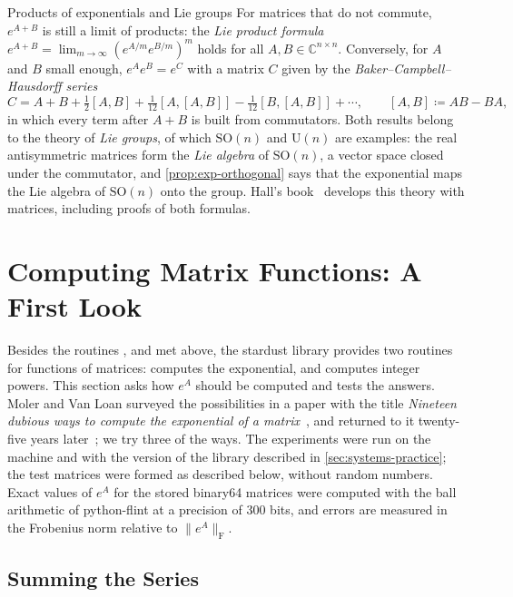\begin{note}{Products of exponentials and Lie groups}
For matrices that do not commute, $e^{A+B}$ is still a limit of products: the \emph{Lie product formula} $e^{A+B}=\lim_{m\to\infty}(e^{A/m}e^{B/m})^m$ holds for all $A,B\in\mathbb C^{n\times n}$. Conversely, for $A$ and $B$ small enough, $e^Ae^B=e^C$ with a matrix $C$ given by the \emph{Baker--Campbell--Hausdorff series}
\[
C=A+B+\tfrac12[A,B]+\tfrac1{12}[A,[A,B]]-\tfrac1{12}[B,[A,B]]+\cdots,\qquad[A,B]\coloneqq AB-BA ,
\]
in which every term after $A+B$ is built from commutators. Both results belong to the theory of \emph{Lie groups}, of which $\mathrm{SO}(n)$ and $\mathrm U(n)$ are examples: the real antisymmetric matrices form the \emph{Lie algebra} of $\mathrm{SO}(n)$, a vector space closed under the commutator, and \cref{prop:exp-orthogonal} says that the exponential maps the Lie algebra of $\mathrm{SO}(n)$ onto the group. Hall's book~\cite{hall2015} develops this theory with matrices, including proofs of both formulas.
\end{note}

\section{Computing Matrix Functions: A First Look}
\label{sec:computing-matrix-functions}

Besides the routines ,  and  met above, the stardust library provides two routines for functions of matrices:  computes the exponential, and  computes integer powers. This section asks how $e^A$ should be computed and tests the answers. Moler and Van Loan surveyed the possibilities in a paper with the title \emph{Nineteen dubious ways to compute the exponential of a matrix}~\cite{moler1978}, and returned to it twenty-five years later~\cite{moler2003}; we try three of the ways. The experiments were run on the machine and with the version of the library described in \cref{sec:systems-practice}; the test matrices were formed as described below, without random numbers. Exact values of $e^A$ for the stored binary64 matrices were computed with the ball arithmetic of python-flint at a precision of $300$ bits, and errors are measured in the Frobenius norm relative to $\|e^A\|_{\mathrm F}$.

\subsection{Summing the Series}

